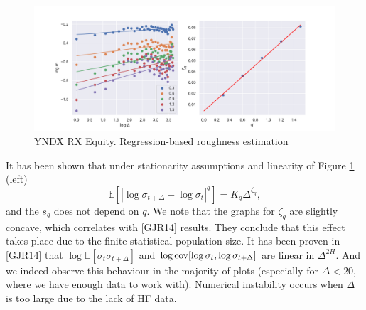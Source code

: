             \begin{frame}{}
                \begin{figure}[htbp]
                    \includegraphics[width=\textwidth]{fig/YNDX RX Equity Hurst Est.pdf}
                    \caption{YNDX RX Equity. Regression-based roughness estimation}
                    \label{fig:logMDelta}
                \end{figure}
            \end{frame}

            \begin{frame}{}
                It has been shown that under stationarity assumptions and linearity of Figure \ref{fig:logMDelta} (left)
                \begin{equation}
                    \mathbb{E}\left[\left|\log\sigma_{t+\Delta} - \log\sigma_{t}\right|^q\right] = K_q \Delta^{\zeta_q},
                \end{equation} 
                and the $s_q$ does not depend on $q$. 
                We note that the graphs for $\zeta_q$ are slightly concave, which correlates with [GJR14] results.
                They conclude that this effect takes place due to the finite statistical population size. It has been proven in [GJR14] that $\log\mathbb{E}[\sigma_{t}\sigma_{t+\Delta}]$ and $\log \operatorname*{cov}[\log\sigma_t, \log\sigma_{t+\Delta}]$ are linear in $\Delta^{2H}$. And we indeed observe this behaviour in the majority of plots (especially for $\Delta < 20$, where we have enough data to work with).
                Numerical instability occurs when $\Delta$ is too large due to the lack of HF data.
            \end{frame}

